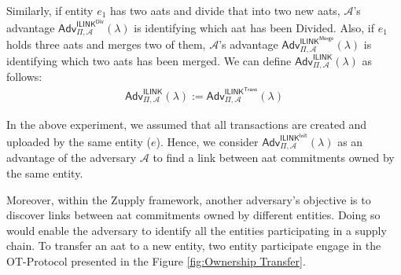 \begin{definition}
Similarly, if entity $e_1$ has two \gls{aat}s and divide that into two new \gls{aat}s, $\mathcal{A}$'s advantage $\mathsf{Adv}^{\mathsf{ILINK}^\textsf{Div}}_{\Pi, \mathcal{A}}(\lambda)$ is identifying which \gls{aat} has been Divided. Also, if $e_1$ holds three \gls{aat}s and merges two of them, $\mathcal{A}$'s advantage $\mathsf{Adv}^{\mathsf{ILINK}^\textsf{Merge}}_{\Pi, \mathcal{A}}(\lambda)$ is identifying which two \gls{aat}s has been merged. We can define $\mathsf{Adv}^{\mathsf{ILINK}}_{\Pi, \mathcal{A}}(\lambda)$ as follows:
\begin{align}
\label{eq:Adv_ILINK}
    \mathsf{Adv}^{\mathsf{ILINK}}_{\Pi, \mathcal{A}}(\lambda) :=
    \mathsf{Adv}^{\mathsf{ILINK}^\textsf{Trans}}_{\Pi, \mathcal{A}}(\lambda)
\end{align}
            \end{definition}
            In the above experiment, we assumed that all transactions are created and uploaded by the same entity ($e$). 
            Hence, we consider $\mathsf{Adv}^{\mathsf{ILINK}^\textsf{Init}}_{\Pi, \mathcal{A}}(\lambda)$ as an advantage of the adversary $\mathcal{A}$ to find a  link between \gls{aat} commitments owned by the same entity.

Moreover, within the Zupply framework, another adversary's objective is to discover links between \gls{aat} commitments owned by different entities. Doing so would enable the adversary to identify all the entities participating in a supply chain. To transfer an \gls{aat} to a new entity, two entity participate engage in the \textsf{OT-Protocol} presented in the Figure \ref{fig:Ownership Transfer}.


